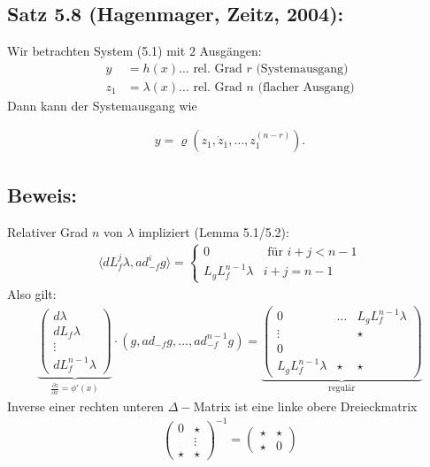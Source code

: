 \documentclass[ngerman]{tudscrreprt}
\begin{document}
\subsection*{Satz 5.8 (Hagenmager, Zeitz, 2004):}Wir betrachten System (5.1) mit $2$ Ausgängen: \begin{align*}
y&= h(x)\dots \text{ rel. Grad $r$ (Systemausgang)}\\ 
z_1&=\lambda(x)\dots \text{ rel. Grad $n$ (flacher Ausgang)}
\end{align*}Dann kann der Systemausgang wie 


\begin{align*}
y = \varrho(z_1, \dot z_1, \dots, z_1^{(n-r)}).
\end{align*}
\subsection*{Beweis:}Relativer Grad $n$ von $\lambda$ impliziert (Lemma 5.1/5.2): \begin{align*}
\langle dL_f^j \lambda, ad_{-f}^i g \rangle = \left\{\begin{matrix} 0 & \text{ für } i + j < n-1\\ L_gL_f^{n-1} \lambda & i+j=n-1\end{matrix}  \right.
\end{align*}
Also gilt: \begin{align*}
\underbrace{\begin{pmatrix}d\lambda\\ dL_f\lambda\\ \vdots\\ dL_f^{n-1}\lambda\end{pmatrix} }_{\frac{\partial z}{\partial x} = \phi'(x)}\cdot (g, ad_{-f} g, \dots, ad_{-f}^{n-1} g) = \underbrace{\begin{pmatrix} 0 & \dots & L_gL_f^{n-1}\lambda\\ \vdots & & \star\\ 0 && \\ L_gL_f^{n-1}\lambda & \star &\star \end{pmatrix}}_{\text{ regulär }} \tag{ *}
\end{align*}
Inverse einer rechten unteren $\Delta-$Matrix ist eine linke obere Dreieckmatrix \begin{align*}
\begin{pmatrix}
0 & \star\\ &\vdots\\ \star & \star \end{pmatrix}^{-1} = \begin{pmatrix} \star & \star\\ \star & 0\end{pmatrix} \tag{ **}
\end{align*}
\end{document}
